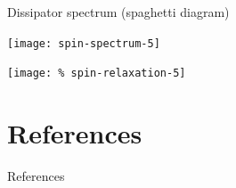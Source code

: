 \documentclass[12pt,c]{beamer}
\begin{document}
\begin{frame}{Dissipator spectrum (spaghetti diagram)}
  \begin{center}
    \texttt{[image: spin-spectrum-5]}
  \end{center}
\end{frame}

\begin{frame}
  \begin{center}
    \texttt{[image: \%
    spin-relaxation-5]}
  \end{center}
\end{frame}


\section*{References}

\begin{frame}{References}
  \nocite{opensys,liebTwoSolubleModels1961,pfeutyOnedimensionalIsingModel1970}
  \printbibliography%
\end{frame}
\end{document}
